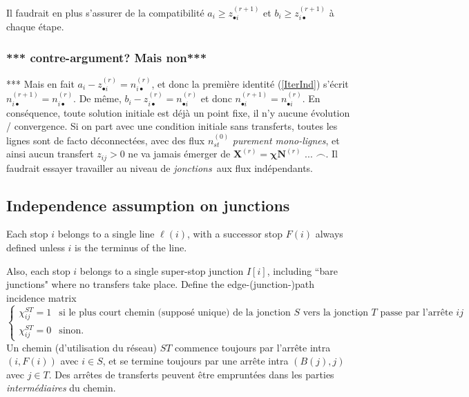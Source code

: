 \documentclass{article}
\theoremstyle{plain}
\begin{document}
Il faudrait en plus s'assurer de la compatibilité $a_i\ge z_{\bullet i}^{(r+1)}$ et $b_i\ge z_{i\bullet}^{(r+1)}$ à chaque étape. 

\subsubsection{*** contre-argument? Mais non***}
*** Mais en fait $a_i-z_{\bullet i}^{(r)}=n_{i\bullet}^{(r)}$, et donc la première identité (\ref{IterInd}) s'écrit $n_{i\bullet}^{(r+1)}=n_{i\bullet}^{(r)}$. De même, 
$b_i-z_{i\bullet}^{(r)}=n_{\bullet i}^{(r)}$ et donc $n_{\bullet i}^{(r+1)}=n_{\bullet i}^{(r)}$. En conséquence, toute solution initiale est déjà un point fixe, il n'y aucune évolution / convergence. Si on part avec une condition initiale sans transferts, toutes les lignes sont de facto déconnectées, avec des flux $n_{st}^{(0)}$ {\em purement mono-lignes},  et ainsi aucun transfert $z_{ij}>0$ ne va jamais émerger de $\mathbf{X}^{(r)}=\bm{\chi}\mathbf{N}^{(r)}$ ... $\frown$. Il faudrait essayer travailler au niveau de {\em jonctions} aux flux indépendants.  

\subsection{Independence assumption on junctions}
Each stop $i$ belongs to a single line $\ell(i)$, with a successor stop $F(i)$ always defined unless $i$ is the terminus of the line. 

Also, each stop  $i$ belongs to a single super-stop junction $I[i]$, including ``bare junctions" where no transfers take place.  Define the edge-(junction-)path incidence matrix
\begin{equation}
\label{ }
\begin{cases}
 \chi_{ij}^{ST}=1     & \text{si  le plus court chemin (supposé unique)  de la jonction $S$ vers la jonction $T$ passe par l'arrête $ij$}, \\
 \chi_{ij}^{ST}=0         & \text{sinon}.
\end{cases}
\end{equation}
Un chemin (d'utilisation du réseau) $ST$ commence toujours par l'arrête intra $(i, F(i))$ avec $i\in S$, et se termine toujours par une arrête intra $(B(j),j)$ avec $j\in T$. Des arrêtes de transferts peuvent être empruntées dans les parties {\em intermédiaires} du chemin. 
\end{document}
